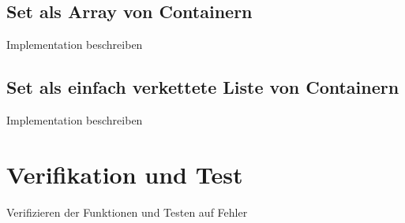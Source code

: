 \documentclass[11pt]{scrartcl}
\begin{document}
\subsection{Set als Array von Containern}
\label{sec:setConArray}

Implementation beschreiben

\subsection{Set als einfach verkettete Liste von Containern}
\label{sec:setCon}

Implementation beschreiben

\section{Verifikation und Test}
\label{sec:ver-test}

Verifizieren der Funktionen und Testen auf Fehler
\end{document}
